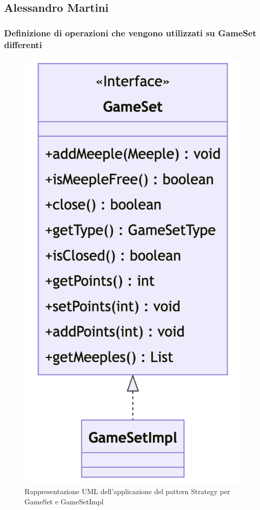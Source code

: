 \subsection*{Alessandro Martini}

\subsubsection*{Definizione di operazioni che vengono utilizzati su GameSet differenti}
\begin{figure}[ht]
    \centering\includegraphics[scale=.4]{images/gameset.png}
    \caption{Rappresentazione UML dell'applicazione del pattern Strategy per GameSet e GameSetImpl}
\end{figure}

